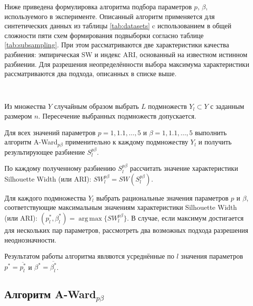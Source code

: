 \documentclass[12pt]{a&t}
\begin{document}
Ниже приведена формулировка алгоритма подбора параметров $ p $, $ \beta $, используемого в эксперименте. Описанный алгоритм применяется для синтетических данных из таблицы \ref{tab:datasets} c использованием в общей сложности пяти схем формирования подвыборки согласно таблице \ref{tab:subsampling}. При этом рассматриваются две характеристики качества разбиения: эмпирическая SW и индекс ARI, основанный на известном истинном разбиении. Для разрешения неопределённости выбора максимума характеристики рассматриваются два подхода, описанных в списке выше.

\begin{algorithm} \label{alg:experiment}
	\
	\begin{enumlist}[.] 
		\item
		Из множества $ Y $ случайным образом выбрать $ L $ подмножеств $ Y_l \subset Y $ с заданным размером $ n $. Пересечение выбранных подмножеств допускается.
		
		\item
		Для всех значений параметров $ p=1,1.1,\ldots,5 $ и $ \beta=1,1.1,\ldots,5 $ выполнить алгоритм \mbox{A-Ward$ _{p\beta} $} применительно к каждому подмножеству  $ Y_l $ и получить результирующее разбиение $ S_l^{p\beta} $.
		
		\item
		По каждому полученному разбиению  $ S_l^{p\beta} $ рассчитать значение характеристики Silhouette Width (или ARI): $ SW_l^{p\beta} = SW(S_l^{p\beta}) $.
		
		\item
		Для каждого подмножества $ Y_l $ выбрать рациональные значения параметров $ p $ и $ \beta $, соответствующие максимальным значениям характеристики Silhouette Width (или ARI): $ (p^*_l,\beta^*_l)=\operatorname{arg\,max}\{SW_l^{p\beta}\} $. В случае, если максимум достигается для нескольких пар параметров, рассмотреть два возможных подхода разрешения неоднозначности. 
		
		\item Результатом работы алгоритма являются усреднённые по $ l $ значения параметров $ p^* = \overline{p^*_l} $ и $ \beta^* = \overline{\beta^*_l} $. 
		
	\end{enumlist}
\end{algorithm}

\subsection{Алгоритм \mbox{A-Ward$ _{p\beta} $}} \label{sec:a-ward-p-beta}
\end{document}
